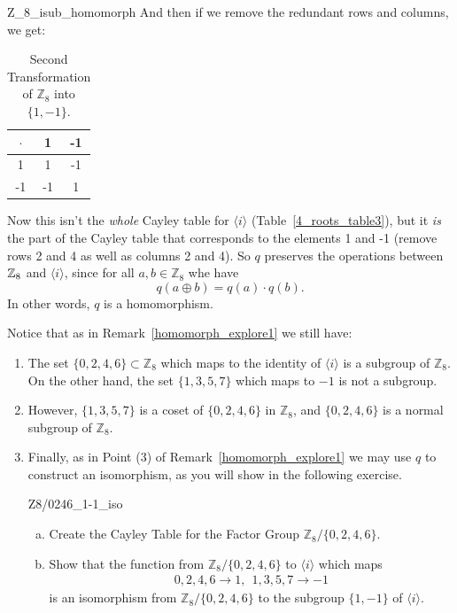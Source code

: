 \begin{example}{Z_8_isub_homomorph}
And then if we remove the redundant rows and columns, we get:

\begin{table}[H]
\caption{\label{1,-1_Z8_transfom2}Second Transformation of ${\mathbb Z}_8$ into $\{1,-1\}$.}{\small
\begin{center}
\begin{tabular}{c|cc}
$\cdot$ & 1 & -1  \\
\hline
1        & 1 & -1  \\
-1       & -1 & 1 \\
\end{tabular}
\end{center}
}
\end{table}

Now this isn't the \emph{whole} Cayley table for $\langle i \rangle$ (Table~\ref{4_roots_table3}), but it \emph{is} the part of the Cayley table that corresponds to the elements 1 and -1 (remove rows 2 and 4 as well as columns 2 and 4).  So $q$  preserves the operations between $\mathbb{Z}_8$ and $\langle i \rangle$, since for all $a,b \in {\mathbb Z}_8$ whe have
\[
q(a \oplus b) = q(a) \cdot q(b).
\]
In other words, $q$ is a homomorphism.
\end{example}

\begin{rem}\label{homomorph_explore2}
Notice that as in Remark~\ref{homomorph_explore1} we still have:

\begin{enumerate}[(1)]
\item
The set $\{0,2,4,6\} \subset {\mathbb Z}_8$ which maps to  the identity of $\langle i \rangle$ is a  subgroup of  ${\mathbb Z}_8$.  On the other hand, the set $\{1,3,5,7\}$ which maps to $-1$ is not a subgroup.

\item
However, $\{1,3,5,7\}$ is a coset of $\{0,2,4,6\}$ in ${\mathbb Z}_8$, and $\{0,2,4,6\}$ is a normal subgroup of ${\mathbb Z}_8$.

\item
Finally, as in Point (3) of Remark~\ref{homomorph_explore1} we may use $q$ to construct an isomorphism, as you will show in the following exercise.

\begin{exercise}{Z8/0246_1-1_iso}
\begin{enumerate}[(a)]
\item
Create the Cayley Table for the Factor Group ${\mathbb Z}_8/ \{0,2,4,6\}$.
\item
Show that the function from ${\mathbb Z}_8/ \{0,2,4,6\}$  to $\langle i \rangle$  which maps
\begin{align*}
    0,2,4,6 \longrightarrow 1 ,~~     1,3,5,7 \longrightarrow -1
\end{align*}
is an isomorphism from ${\mathbb Z}_8/ \{0,2,4,6\}$ to the subgroup $\{1,-1\}$ of $ \langle i \rangle$.
\end{enumerate}
\end{exercise}

\end{enumerate}
\end{rem}


